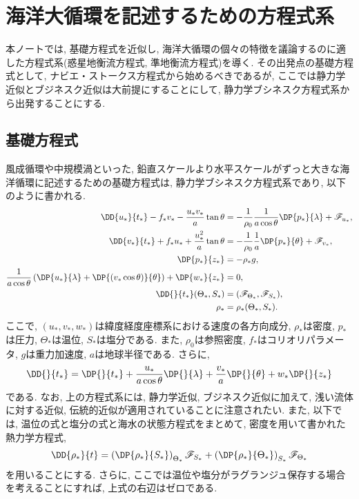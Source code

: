 \chapter{海洋大循環を記述するための方程式系}
本ノートでは, 基礎方程式を近似し, 海洋大循環の個々の特徴を議論するのに適した方程式系(惑星地衡流方程式, 準地衡流方程式)を導く. 
その出発点の基礎方程式として, ナビエ・ストークス方程式から始めるべきであるが, 
ここでは静力学近似とブジネスク近似は大前提にすることにして, 
静力学ブシネスク方程式系から出発することにする. 

\section{基礎方程式}
風成循環や中規模渦といった, 鉛直スケールより水平スケールがずっと大きな海洋循環に記述するための基礎方程式は, 
静力学ブシネスク方程式系であり, 以下のように書かれる. 
\begin{subequations} %
  \begin{align}
    \DD{u_*}{t_*} - f_* v_* - \dfrac{u_* v_*}{a} \tan \theta  &= - \dfrac{1}{\rho_0} \dfrac{1}{a \cos \theta} \DP{p_*}{\lambda} + \mathscr{F}_{u_*}, \\
    \DD{v_*}{t_*} + f_* u_* + \dfrac{u_*^2}{a} \tan \theta &= - \dfrac{1}{\rho_0} \dfrac{1}{a} \DP{p_*}{\theta} + \mathscr{F}_{v_*}, \\
    \DP{p_*}{z_*} &= - \rho_* g, \\
    \dfrac{1}{a \cos \theta} \left( \DP{u_*}{\lambda} + \DP{ (v_* \cos{\theta})}{\theta} \right)  + \DP{w_*}{z_*} &= 0, \\
    \DD{}{t_*} (\Theta_*, S_*) &= (\mathscr{F}_{\Theta_*}, \mathscr{F}_{S_*}), \\
    \rho_* &= \rho_* (\Theta_*, S_*). 
  \end{align}
  \label{eq:basic_system}
\end{subequations}
ここで, $(u_*,v_*,w_*)$は緯度経度座標系における速度の各方向成分, 
$\rho_*$は密度, $p_*$は圧力, $\Theta_*$は温位, $S_*$は塩分である. 
また, $\rho_0$は参照密度, $f_*$はコリオリパラメータ, $g$は重力加速度, 
$a$は地球半径である. 
さらに, 
\begin{equation}
  \DD{}{t_*} =  \DP{}{t_*} + \dfrac{u_*}{a \cos \theta}\DP{}{\lambda} + \dfrac{v_*}{a} \DP{}{\theta} + w_* \DP{}{z_*}
\end{equation}
である. 
なお, 上の方程式系には, 静力学近似, ブジネスク近似に加えて, 
浅い流体に対する近似, 伝統的近似が適用されていることに注意されたい. 
また, 以下では, 温位の式と塩分の式と海水の状態方程式をまとめて, 密度を用いて書かれた熱力学方程式, 
\begin{align}
 \DD{\rho_*}{t} = \left(\DP{\rho_*}{S_*}\right)_{\Theta_*} \mathscr{F}_{S_*} + \left(\DP{\rho_*}{\Theta_*}\right)_{S_*} \mathscr{F}_{\Theta_*} 
\end{align}
を用いることにする. 
さらに, ここでは温位や塩分がラグランジュ保存する場合を考えることにすれば, 
上式の右辺はゼロである. 

